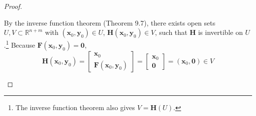 \documentclass{article}
\newcommand{\R}{\mathbb{R}}
\newcommand{\x}{\mathbf{x}}
\newcommand{\F}{\mathbf{F}}
\newcommand{\y}{\mathbf{y}}
\newcommand{\ze}{\mathbf{0}}
\theoremstyle{definition}
\begin{document}
\begin{proof}
\begin{enumerate}
			By the inverse function theorem (Theorem 9.7), there exists open sets $ U,V\subset \R^{n+m} $ with $ (\x_0,\y_0)\in U $, $ \mathbf H(\x_0,\y_0)\in V $, such that $ \mathbf H $ is invertible on $ U $.\footnote{The inverse function theorem also gives $ V=\mathbf H(U) $.} Because $ \F(\x_0,\y_0) = \ze$, 
			\begin{equation}\label{key}
				\mathbf H(\x_0,\y_0)= \begin{bmatrix}
					\x_0 \\ \F(\x_0,\y_0)
				\end{bmatrix} = \begin{bmatrix}
					\x_0 \\ \ze 
				\end{bmatrix} = (\x_0, \ze)\in V
			\end{equation} 
			

\end{enumerate}
\end{proof}
\end{document}
